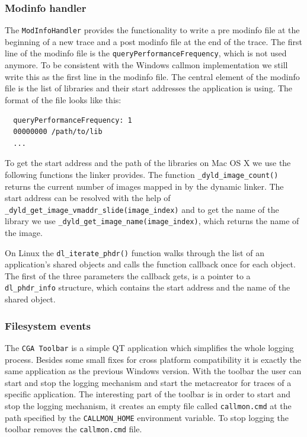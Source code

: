 \subsubsection{Modinfo handler}

The \verb=ModInfoHandler= provides the functionality to write a pre modinfo file at the beginning of a new trace and a post modinfo file at the end of the trace. The first line of the modinfo file is the \verb=queryPerformanceFrequency=, which is not used anymore. To be consistent with the Windows callmon implementation we still write this as the first line in the modinfo file. The central element of the modinfo file is the list of libraries and their start addresses the application is using. The format of the file looks like this:

\begin{verbatim}
  queryPerformanceFrequency: 1
  00000000 /path/to/lib
  ...
\end{verbatim}

To get the start address and the path of the libraries on Mac OS X we use the following functions the linker provides. The function \verb=_dyld_image_count()= returns the current number of images mapped in by the dynamic linker. The start address can be resolved with the help of \verb=_dyld_get_image_vmaddr_slide(image_index)= and to get the name of the library we use \verb=_dyld_get_image_name(image_index)=, which returns the name of the image.

On Linux the \verb=dl_iterate_phdr()= function walks through the list of an application's shared objects and calls the function callback once for each object. The first of the three parameters the callback gets, is a pointer to a \verb=dl_phdr_info= structure, which contains the start address and the name of the shared object.


\subsubsection{Filesystem events}

The \verb=CGA Toolbar= is a simple QT application which simplifies the whole logging process. Besides some small fixes for cross platform compatibility it is exactly the same application as the previous Windows version. With the toolbar the user can start and stop the logging mechanism and start the metacreator for traces of a specific application. The interesting part of the toolbar is in order to start and stop the logging mechanism, it creates an empty file called \verb=callmon.cmd= at the path specified by the \verb=CALLMON_HOME= environment variable. To stop logging the toolbar removes the \verb=callmon.cmd= file.


